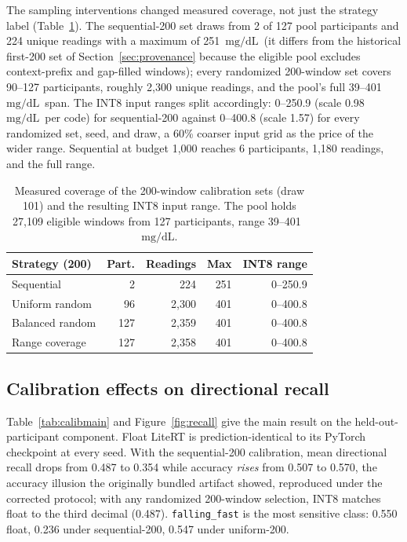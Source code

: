 \documentclass[10pt,twocolumn]{article}
\newcommand{\mgdl}{\ensuremath{\mathrm{mg/dL}}}
\begin{document}
The sampling interventions changed measured coverage, not just the
strategy label (Table~\ref{tab:coverage}). The sequential-200 set draws
from 2 of 127 pool participants and 224 unique readings with a maximum of
251~\mgdl\ (it differs from the historical first-200 set of
Section~\ref{sec:provenance} because the eligible pool excludes
context-prefix and gap-filled windows); every randomized 200-window set
covers 90--127 participants,
roughly 2,300 unique readings, and the pool's full 39--401~\mgdl\ span.
The INT8 input ranges split accordingly: 0--250.9 (scale 0.98~\mgdl\ per
code) for sequential-200 against 0--400.8 (scale 1.57) for every
randomized set, seed, and draw, a 60\% coarser input grid as the price of
the wider range. Sequential at budget 1,000 reaches 6 participants, 1,180
readings, and the full range.

\begin{table}[t]
\centering
\caption{Measured coverage of the 200-window calibration sets (draw 101)
and the resulting INT8 input range. The pool holds 27,109 eligible windows
from 127 participants, range 39--401~\mgdl.}
\label{tab:coverage}
\footnotesize
\begin{tabular}{@{}lrrrr@{}}
\toprule
Strategy (200) & Part. & Readings & Max & INT8 range \\
\midrule
Sequential & 2 & 224 & 251 & 0--250.9 \\
Uniform random & 96 & 2,300 & 401 & 0--400.8 \\
Balanced random & 127 & 2,359 & 401 & 0--400.8 \\
Range coverage & 127 & 2,358 & 401 & 0--400.8 \\
\bottomrule
\end{tabular}
\end{table}

\subsection{Calibration effects on directional recall}
\label{sec:maineffects}

Table~\ref{tab:calibmain} and Figure~\ref{fig:recall} give the main result
on the held-out-participant component. Float LiteRT is prediction-identical
to its PyTorch checkpoint at every seed. With the sequential-200
calibration, mean directional recall drops from 0.487 to 0.354 while
accuracy \emph{rises} from 0.507 to 0.570, the accuracy illusion the
originally bundled artifact showed, reproduced under the corrected
protocol; with any randomized 200-window selection, INT8 matches float to
the third decimal (0.487). \texttt{falling\_fast} is the most
sensitive class: 0.550 float, 0.236 under sequential-200, 0.547 under
uniform-200.
\end{document}
